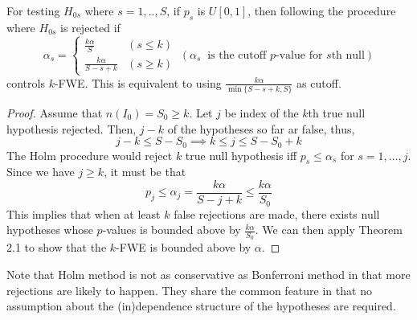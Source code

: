 \begin{mdframed}[backgroundcolor=green!5] 
\begin{theorem}  For testing $H_{0s}$ where $s=1,..,S$, if $p_s$ is $U[0,1]$, then following the procedure where $H_{0s}$ is rejected if
\[
\alpha_s = \begin{cases}\frac{k\alpha}{S} & (s\leq k)\\ \frac{k\alpha}{S-s+k}& (s\geq k) \end{cases} \ (\alpha_s \ \text{ is the cutoff $p$-value for $s$th null})
\] controls $k$-FWE. This is equivalent to using $\frac{k\alpha}{\min\{S-s+k, S\}}$ as cutoff.
\begin{proof}
Assume that $n(I_0)=S_0\geq k$. Let $j$ be index of the $k$th true null hypothesis rejected. Then, $j-k$ of the hypotheses so far ar false, thus, 
\[
j-k\leq S-S_0 \implies k\leq j \leq S-S_0+k
\]
The Holm procedure would reject $k$ true null hypothesis iff $p_s \leq \alpha_s$ for $s=1,...,j$. Since we have $j\geq k$, it must be that
\[
p_j \leq \alpha_j =\frac{k\alpha}{S-j+k}\leq \frac{k\alpha}{S_0}
\]
This implies that when at least $k$ false rejections are made, there exists null hypotheses whose $p$-values is bounded above by $\frac{k\alpha}{S_0}$. We can then apply Theorem 2.1 to show that the $k$-FWE is bounded above by $\alpha$.
\end{proof}
\end{theorem}
\end{mdframed} \par
Note that Holm method is not as conservative as Bonferroni method in that more rejections are likely to happen. They share the common feature in that no assumption about the (in)dependence structure of the hypotheses are required. 
